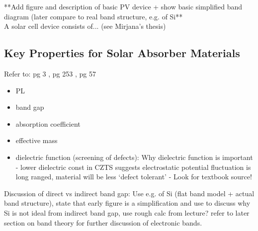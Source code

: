 **Add figure and description of basic PV device + show basic simplified band diagram (later compare to real band structure, e.g. of Si**\\

A solar cell device consists of... (see Mirjana's thesis)

\subsection{Key Properties for Solar Absorber Materials}\label{PV_properties}
Refer to: pg 3 \cite{spatial_resolved_book}, pg 253 \cite{fund_semi}, pg 57 \cite{PV_Goetzberger}\\

\begin{itemize}
\item PL
\item band gap
\item absorption coefficient
\item effective mass
\item dielectric function (screening of defects):   Why dielectric function is important - lower dielectric const in CZTS suggests electrostatic potential fluctuation is long ranged, material will be less `defect tolerant' - Look for textbook source!
\end{itemize}
Discussion of direct vs indirect band gap: Use e.g. of Si (flat band model + actual band structure), state that early figure is a simplification and use to discuss why Si is not ideal from indirect band gap, use rough calc from lecture? refer to later section on band theory for further discussion of electronic bands.


